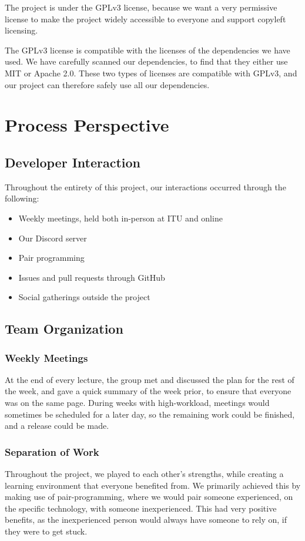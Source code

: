 \documentclass{article}
\begin{document}
The project is under the GPLv3 license\cite{gplv3}, because we want a very permissive license to make the project widely accessible to everyone and support copyleft licensing.

The GPLv3 license is compatible with the licenses of the dependencies we have used. We have carefully scanned our dependencies, to find that they either use MIT or Apache 2.0. These two types of licenses are compatible with GPLv3, and our project can therefore safely use all our dependencies.
\section{Process Perspective}

\subsection{Developer Interaction}
Throughout the entirety of this project, our interactions occurred through the following:
\begin{itemize}
    \item Weekly meetings, held both in-person at ITU and online
    \item Our Discord server
    \item Pair programming
    \item Issues and pull requests through GitHub
    \item Social gatherings outside the project
\end{itemize}

\subsection{Team Organization}
\subsubsection{Weekly Meetings}
At the end of every lecture, the group met and discussed the plan for the rest of the week, and gave a quick summary of the week prior, to ensure that everyone was on the same page. During weeks with high-workload, meetings would sometimes be scheduled for a later day, so the remaining work could be finished, and a release could be made.

\subsubsection{Separation of Work}
Throughout the project, we played to each other's strengths, while creating a learning environment that everyone benefited from. We primarily achieved this by making use of pair-programming, where we would pair someone experienced, on the specific technology, with someone inexperienced. This had very positive benefits, as the inexperienced person would always have someone to rely on, if they were to get stuck.
\end{document}
